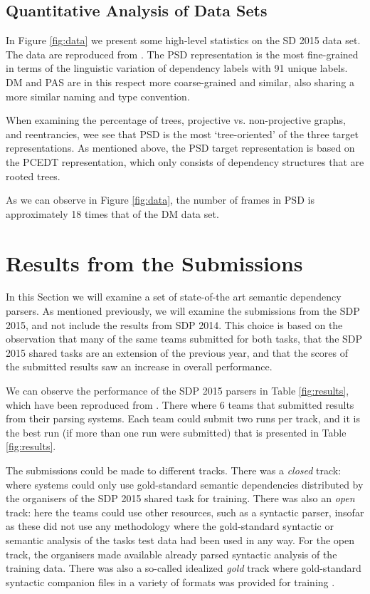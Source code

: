 \subsection{Quantitative Analysis of Data Sets}
\label{sec:quantitative}

In Figure \ref{fig:data} we present some high-level statistics on the SD 2015 data set. The data are reproduced from . The PSD representation is the most fine-grained in terms of the linguistic variation of dependency labels with 91 unique labels. DM and PAS are in this respect more coarse-grained and similar, also sharing a more similar naming and type convention.

When examining the percentage of trees, projective vs. non-projective graphs, and reentrancies, wee see that PSD is the most `tree-oriented' of the three target representations. As mentioned above, the PSD target representation is based on the PCEDT representation, which only consists of dependency structures that are rooted trees. 

As we can observe in Figure \ref{fig:data}, the number of frames in PSD is approximately 18 times that of the DM data set. 

\section{Results from the Submissions}
\label{sec:parsers}

In this Section we will examine a set of state-of-the art semantic dependency parsers. As mentioned previously, we will examine the submissions from the SDP 2015, and not include the results from SDP 2014. This choice is based on the observation that many of the same teams submitted for both tasks, that the SDP 2015 shared tasks are an extension of the previous year, and that the scores of the submitted results saw an increase in overall performance.

We can observe the performance of the SDP 2015 parsers in Table \ref{fig:results}, which have been reproduced from . There where 6 teams that submitted results from their parsing systems. Each team could submit two runs per track, and it is the best run (if more than one run were submitted) that is presented in Table \ref{fig:results}. 

The submissions could be made to different tracks. There was a \textit{closed} track: where systems could only use gold-standard semantic dependencies distributed by the organisers of the SDP 2015 shared task for training. There was also an \textit{open} track: here the teams could use other resources, such as a syntactic parser, insofar as these did not use any methodology where the gold-standard syntactic or semantic analysis of the tasks test data had been used in any way. For the open track, the organisers made available already parsed syntactic analysis of the training data. There was also a so-called idealized \textit{gold} track where gold-standard syntactic companion files in a variety of formats was provided for training \cite{Oepen:15}.

